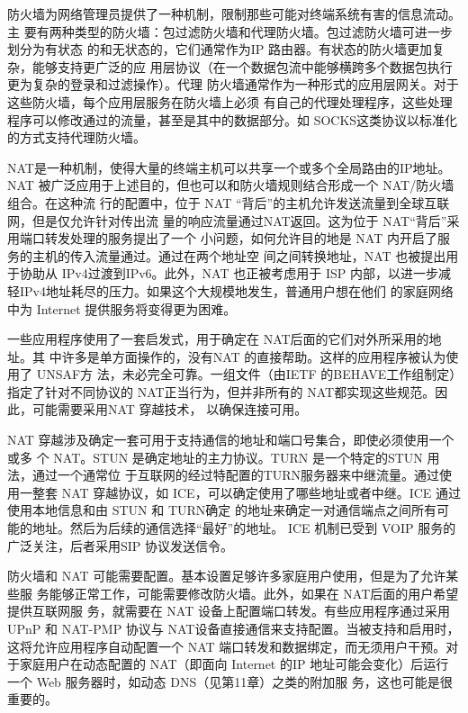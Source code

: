 防火墙为网络管理员提供了一种机制，限制那些可能对终端系统有害的信息流动。主
要有两种类型的防火墙：包过滤防火墙和代理防火墙。包过滤防火墙可进一步划分为有状态
的和无状态的，它们通常作为IP 路由器。有状态的防火墙更加复杂，能够支持更广泛的应
用层协议（在一个数据包流中能够横跨多个数据包执行更为复杂的登录和过滤操作）。代理
防火墙通常作为一种形式的应用层网关。对于这些防火墙，每个应用层服务在防火墙上必须
有自己的代理处理程序，这些处理程序可以修改通过的流量，甚至是其中的数据部分。如
SOCKS这类协议以标准化的方式支持代理防火墙。

NAT是一种机制，使得大量的终端主机可以共享一个或多个全局路由的IP地址。NAT
被广泛应用于上述目的，但也可以和防火墙规则结合形成一个 NAT/防火墙组合。在这种流
行的配置中，位于 NAT “背后”的主机允许发送流量到全球互联网，但是仅允许针对传出流
量的响应流量通过NAT返回。这为位于 NAT“背后”采用端口转发处理的服务提出了一个
小问题，如何允许目的地是 NAT 内开启了服务的主机的传入流量通过。通过在两个地址空
间之间转换地址，NAT 也被提出用于协助从 IPv4过渡到IPv6。此外，NAT 也正被考虑用于
ISP 内部，以进一步减轻IPv4地址耗尽的压力。如果这个大规模地发生，普通用户想在他们
的家庭网络中为 Internet 提供服务将变得更为困难。

一些应用程序使用了一套启发式，用于确定在 NAT后面的它们对外所采用的地址。其
中许多是单方面操作的，没有NAT 的直接帮助。这样的应用程序被认为使用了 UNSAF方
法，未必完全可靠。一组文件（由IETF 的BEHAVE工作组制定）指定了针对不同协议的
NAT正当行为，但并非所有的 NAT都实现这些规范。因此，可能需要采用NAT 穿越技术，
以确保连接可用。

NAT 穿越涉及确定一套可用于支持通信的地址和端口号集合，即使必须使用一个或多
个 NAT。STUN 是确定地址的主力协议。TURN 是一个特定的STUN 用法，通过一个通常位
于互联网的经过特配置的TURN服务器来中继流量。通过使用一整套 NAT 穿越协议，如
ICE，可以确定使用了哪些地址或者中继。ICE 通过使用本地信息和由 STUN 和 TURN确定
的地址来确定一对通信端点之间所有可能的地址。然后为后续的通信选择“最好”的地址。
ICE 机制已受到 VOIP 服务的广泛关注，后者采用SIP 协议发送信令。

防火墙和 NAT 可能需要配置。基本设置足够许多家庭用户使用，但是为了允许某些服
务能够正常工作，可能需要修改防火墙。此外，如果在 NAT后面的用户希望提供互联网服
务，就需要在 NAT 设备上配置端口转发。有些应用程序通过采用 UPnP 和 NAT-PMP 协议与
NAT设备直接通信来支持配置。当被支持和启用时，这将允许应用程序自动配置一个 NAT
端口转发和数据绑定，而无须用户干预。对于家庭用户在动态配置的 NAT（即面向 Internet
的IP 地址可能会变化）后运行一个 Web 服务器时，如动态 DNS（见第11章）之类的附加服
务，这也可能是很重要的。

